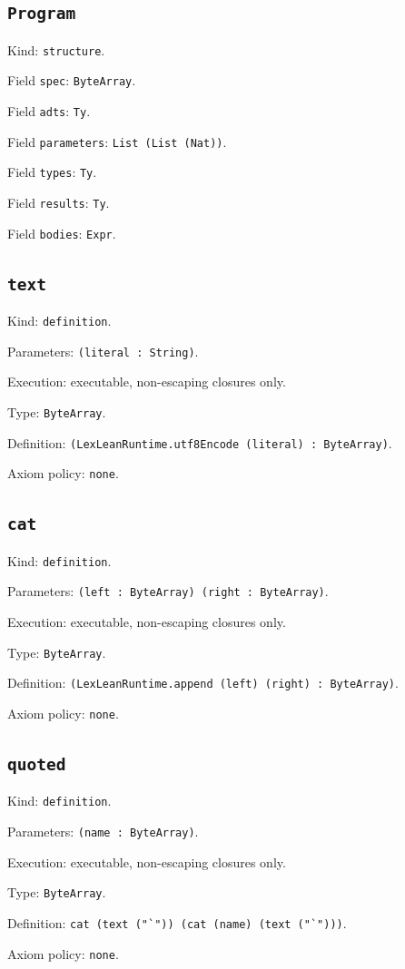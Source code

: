 \documentclass[11pt]{article}
\begin{document}
\subsection*{\texttt{Program}}
\noindent Kind: \texttt{structure}.\par
\noindent Field \texttt{spec}: \texttt{ByteArray}.\par
\noindent Field \texttt{adts}: \texttt{Ty}.\par
\noindent Field \texttt{parameters}: \texttt{List (List (Nat))}.\par
\noindent Field \texttt{types}: \texttt{Ty}.\par
\noindent Field \texttt{results}: \texttt{Ty}.\par
\noindent Field \texttt{bodies}: \texttt{Expr}.\par
\subsection*{\texttt{text}}
\noindent Kind: \texttt{definition}.\par
\noindent Parameters: \texttt{(literal : String)}.\par
\noindent Execution: executable, non-escaping closures only.\par
\noindent Type: \texttt{ByteArray}.\par
\noindent Definition: \texttt{(LexLeanRuntime.utf8Encode (literal) : ByteArray)}.\par
\noindent Axiom policy: \texttt{none}.\par
\subsection*{\texttt{cat}}
\noindent Kind: \texttt{definition}.\par
\noindent Parameters: \texttt{(left : ByteArray) (right : ByteArray)}.\par
\noindent Execution: executable, non-escaping closures only.\par
\noindent Type: \texttt{ByteArray}.\par
\noindent Definition: \texttt{(LexLeanRuntime.append (left) (right) : ByteArray)}.\par
\noindent Axiom policy: \texttt{none}.\par
\subsection*{\texttt{quoted}}
\noindent Kind: \texttt{definition}.\par
\noindent Parameters: \texttt{(name : ByteArray)}.\par
\noindent Execution: executable, non-escaping closures only.\par
\noindent Type: \texttt{ByteArray}.\par
\noindent Definition: \texttt{cat (text ("`")) (cat (name) (text ("`")))}.\par
\noindent Axiom policy: \texttt{none}.\par
\end{document}
